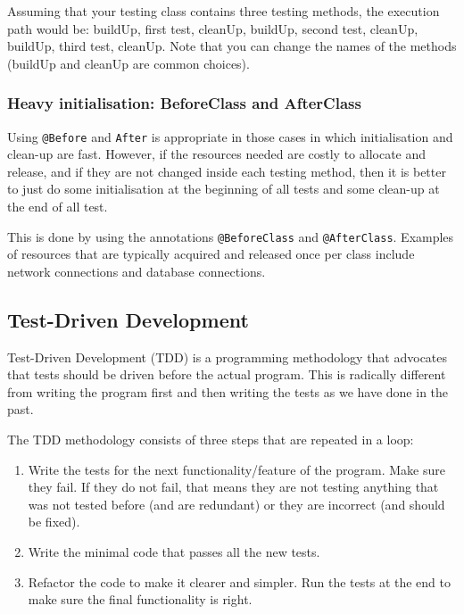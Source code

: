 Assuming that your testing class contains three testing methods, the
execution path would be: buildUp, first test, cleanUp, buildUp, second
test, cleanUp, buildUp, third test, cleanUp. Note that you can change
the names of the methods (buildUp and cleanUp are common choices).

\subsubsection{Heavy initialisation: BeforeClass and AfterClass}
\label{sec:heavy-init-befor}

Using \verb+@Before+ and \verb+After+ is appropriate in those cases in
which initialisation and clean-up are fast. However, if the resources
needed are costly to allocate and release, and if they are not changed
inside each testing method, then it is better to just do some
initialisation at the beginning of all tests and some clean-up at the
end of all test. 

This is done by using the annotations \verb+@BeforeClass+ and
\verb+@AfterClass+. Examples of resources that are typically acquired and
released once per class include network connections and database
connections. 


\subsection{Test-Driven Development}
\label{sec:test-driv-devel}

Test-Driven Development (TDD) is a programming methodology that advocates
that tests should be driven before the actual program. This is
radically different from writing the program first and then writing
the tests as we have done in the past.

The TDD methodology consists of three steps that are repeated in a
loop: 

\begin{enumerate}
\item Write the tests for the next functionality/feature of the program. Make
  sure they fail. If they do not fail, that means they are not testing
  anything that was not tested before (and are redundant) or they are
  incorrect (and should be fixed). 
\item Write the minimal code that passes all the new tests.
\item Refactor the code to make it clearer and simpler. Run the tests
  at the end to make sure the final functionality is right. 
\end{enumerate}

